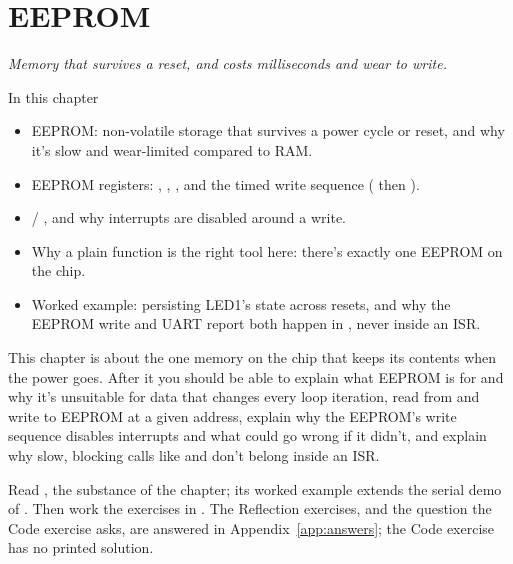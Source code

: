 
\chapter{EEPROM}
\label{c7:ch}

{\large\itshape Memory that survives a reset, and costs milliseconds and wear to write.\par}

\begin{chapterbox}{In this chapter}
\begin{itemize}
  \item EEPROM: non-volatile storage that survives a power cycle or reset, and why it's slow and
    wear-limited compared to RAM.
  \item EEPROM registers: , , , and the timed write sequence
    ( then ).
  \item {} / , and why interrupts are disabled
    around a write.
  \item Why a plain function is the right tool here: there's exactly one EEPROM on the chip.
  \item Worked example: persisting LED1's state across resets, and why the EEPROM write and UART
    report both happen in , never inside an ISR.
\end{itemize}
\end{chapterbox}

This chapter is about the one memory on the chip that keeps its contents when the power goes.
After it you should be able to explain what EEPROM is for and why it's unsuitable for data that
changes every loop iteration, read from and write to EEPROM at a given address, explain why the
EEPROM's write sequence disables interrupts and what could go wrong if it didn't, and explain why
slow, blocking calls like  and  don't belong inside an
ISR.

Read , the substance of the chapter; its worked example extends the serial
demo of . Then work the exercises in . The Reflection
exercises, and the question the Code exercise asks, are answered in Appendix~\ref{app:answers};
the Code exercise has no printed solution.





